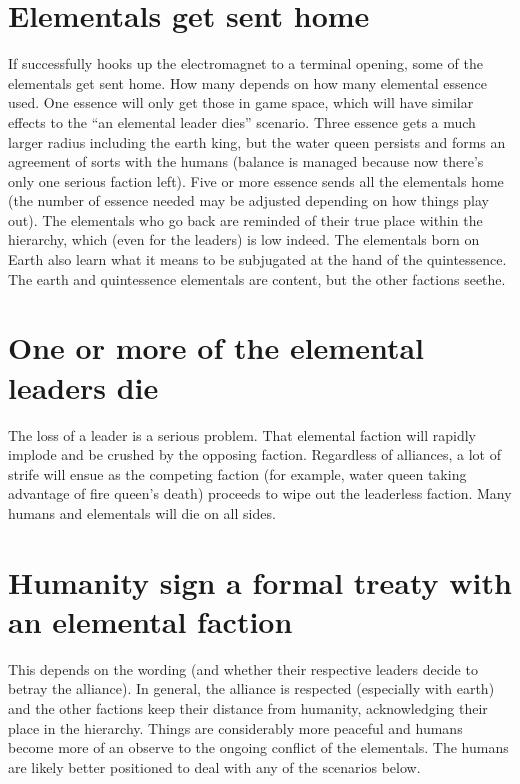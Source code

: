 \documentclass[green]{elementals}
\begin{document}
\name{\gEndGame{}}


\section{Elementals get sent home}

If \cGD{\intro} successfully hooks up the electromagnet to a terminal opening, some of the elementals get sent home. How many depends on how many elemental essence \cGD{} used. One essence will only get those in game space, which will have similar effects to the ``an elemental leader dies'' scenario. Three essence gets a much larger radius including the earth king, but the water queen persists and forms an agreement of sorts with the humans (balance is managed because now there's only one serious faction left). Five or more essence sends all the elementals home (the number of essence needed may be adjusted depending on how things play out). The elementals who go back are reminded of their true place within the hierarchy, which (even for the leaders) is low indeed. The elementals born on Earth also learn what it means to be subjugated at the hand of the quintessence. The earth and quintessence elementals are content, but the other factions seethe.

\section{One or more of the elemental leaders die}

The loss of a leader is a serious problem. That elemental faction will rapidly implode and be crushed by the opposing faction. Regardless of alliances, a lot of strife will ensue as the competing faction (for example, water queen taking advantage of fire queen's death) proceeds to wipe out the leaderless faction. Many humans and elementals will die on all sides.

\section{Humanity sign a formal treaty with an elemental faction}

This depends on the wording (and whether their respective leaders decide to betray the alliance). In general, the alliance is respected (especially with earth) and the other factions keep their distance from humanity, acknowledging their place in the hierarchy. Things are considerably more peaceful and humans become more of an observe to the ongoing conflict of the elementals. The humans are likely better positioned to deal with any of the scenarios below.
\end{document}
